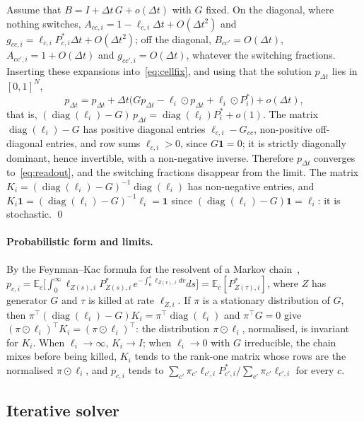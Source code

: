 \documentclass[a4paper, 11pt]{article}
\DeclareMathOperator{\diag}{diag}
\newcommand{\E}{\mathbb{E}}
\theoremstyle{plain}
\theoremstyle{remark}
\begin{document}
Assume that $B = I + \Delta t\,G + o(\Delta t)$ with $G$ fixed. On the diagonal, where nothing switches, $A_{cc,i} = 1 - \ell_{c,i}\Delta t + O(\Delta t^2)$ and $g_{cc,i} = \ell_{c,i}P^\ast_{c,i}\Delta t + O(\Delta t^2)$; off the diagonal, $B_{cc'} = O(\Delta t)$, $A_{cc',i} = 1 + O(\Delta t)$ and $g_{cc',i} = O(\Delta t)$, whatever the switching fractions. Inserting these expansions into~\eqref{eq:cellfix}, and using that the solution $p_{\Delta t}$ lies in $[0,1]^N$,
\[
p_{\Delta t} = p_{\Delta t} + \Delta t\bigl(Gp_{\Delta t} - \ell_i\odot p_{\Delta t} + \ell_i\odot P^\ast_i\bigr) + o(\Delta t),
\]
that is, $(\diag(\ell_i) - G)\,p_{\Delta t} = \diag(\ell_i)P^\ast_i + o(1)$. The matrix $\diag(\ell_i) - G$ has positive diagonal entries $\ell_{c,i} - G_{cc}$, non-positive off-diagonal entries, and row sums $\ell_{c,i} > 0$, since $G\mathbf{1} = 0$; it is strictly diagonally dominant, hence invertible, with a non-negative inverse. Therefore $p_{\Delta t}$ converges to~\eqref{eq:readout}, and the switching fractions disappear from the limit. The matrix $K_i = (\diag(\ell_i) - G)^{-1}\diag(\ell_i)$ has non-negative entries, and $K_i\mathbf{1} = (\diag(\ell_i) - G)^{-1}\ell_i = \mathbf{1}$ since $(\diag(\ell_i) - G)\mathbf{1} = \ell_i$: it is stochastic. \qed

\paragraph{Probabilistic form and limits.} By the Feynman--Kac formula for the resolvent of a Markov chain~\cite{norris1997markov, delmoral2004feynman}, $p_{c,i} = \E_c\bigl[\int_0^\infty \ell_{Z(s),i}P^\ast_{Z(s),i}\,e^{-\int_0^s \ell_{Z(v),i}dv}ds\bigr] = \E_c[P^\ast_{Z(\tau),i}]$, where $Z$ has generator $G$ and $\tau$ is killed at rate $\ell_{Z,i}$. If $\pi$ is a stationary distribution of $G$, then $\pi^\top(\diag(\ell_i) - G)K_i = \pi^\top\diag(\ell_i)$ and $\pi^\top G = 0$ give $(\pi\odot\ell_i)^\top K_i = (\pi\odot\ell_i)^\top$: the distribution $\pi\odot\ell_i$, normalised, is invariant for $K_i$. When $\ell_i \to \infty$, $K_i \to I$; when $\ell_i \to 0$ with $G$ irreducible, the chain mixes before being killed, $K_i$ tends to the rank-one matrix whose rows are the normalised $\pi\odot\ell_i$, and $p_{c,i}$ tends to $\sum_{c'}\pi_{c'}\ell_{c',i}P^\ast_{c',i}/\sum_{c'}\pi_{c'}\ell_{c',i}$ for every $c$.

\subsection{Iterative solver}\label{sup:solver}
\end{document}

